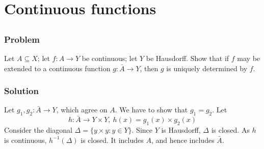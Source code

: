 \setcounter{section}{17} %
\section{Continuous functions}
\label{sec-topspace-continuous}


\setcounter{subsection}{12} %
\subsection{}

\subsubsection{Problem}
Let $A \subseteq X$; let $f : A \to Y$ be continuous; let $Y$ be Hausdorff. Show that if $f$ may be extended to a continuous function $g : \bar A \to Y$, then $g$ is uniquely determined by $f$.

\subsubsection{Solution}
Let $g_1, g_2 : \bar A \to Y$, which agree on $A$. We have to show that $g_1 = g_2$. Let
\[h : \bar A \to Y \times Y,\ h(x) = g_1(x) \times g_2(x) \]
Consider the diagonal $\Delta = \{ y \times y : y \in Y\}$. Since $Y$ is Hausdorff, $\Delta$ is closed. As $h$ is continuous, $h^{-1}(\Delta)$ is closed. It includes $A$, and hence includes $\bar A$.
